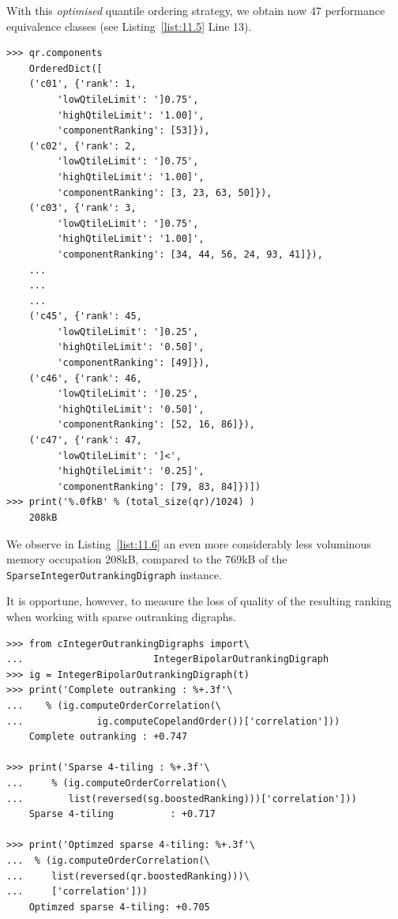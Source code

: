 With this \emph{optimised} quantile ordering strategy, we obtain now 47 performance equivalence classes (see Listing~\vref{list:11.5} Line 13).
\begin{lstlisting}[caption={The ordered components of the sparse outranking digraph},label=list:11.6]
>>> qr.components
    OrderedDict([
    ('c01', {'rank': 1,
	     'lowQtileLimit': ']0.75',
	     'highQtileLimit': '1.00]',
	     'componentRanking': [53]}),
    ('c02', {'rank': 2,
	     'lowQtileLimit': ']0.75',
	     'highQtileLimit': '1.00]',
	     'componentRanking': [3, 23, 63, 50]}),
    ('c03', {'rank': 3,
	     'lowQtileLimit': ']0.75',
	     'highQtileLimit': '1.00]',
	     'componentRanking': [34, 44, 56, 24, 93, 41]}), 
    ...
    ...
    ...
    ('c45', {'rank': 45,
	     'lowQtileLimit': ']0.25',
	     'highQtileLimit': '0.50]',
	     'componentRanking': [49]}),
    ('c46', {'rank': 46,
	     'lowQtileLimit': ']0.25',
	     'highQtileLimit': '0.50]',
	     'componentRanking': [52, 16, 86]}),
    ('c47', {'rank': 47,
	     'lowQtileLimit': ']<',
	     'highQtileLimit': '0.25]',
	     'componentRanking': [79, 83, 84]})])
>>> print('%.0fkB' % (total_size(qr)/1024) )
    208kB
\end{lstlisting}

We observe in Listing~\vref{list:11.6} an even more considerably less voluminous memory occupation 208kB, compared to the 769kB of the \texttt{SparseIntegerOutran\-king\-Digraph} instance.

It is opportune, however, to measure the loss of quality of the resulting \Copeland ranking when working with sparse outranking digraphs.
\begin{lstlisting}[caption={Measuring the loss of quality with respect to the standard outranking digraph},label=list:11.7]
>>> from cIntegerOutrankingDigraphs import\
...                       IntegerBipolarOutrankingDigraph
>>> ig = IntegerBipolarOutrankingDigraph(t)
>>> print('Complete outranking : %+.3f'\
...    % (ig.computeOrderCorrelation(\
...             ig.computeCopelandOrder())['correlation']))
    Complete outranking : +0.747

>>> print('Sparse 4-tiling : %+.3f'\
...     % (ig.computeOrderCorrelation(\
...        list(reversed(sg.boostedRanking)))['correlation']))   
    Sparse 4-tiling          : +0.717

>>> print('Optimzed sparse 4-tiling: %+.3f'\
...  % (ig.computeOrderCorrelation(\
...     list(reversed(qr.boostedRanking)))\
...     ['correlation']))  
    Optimzed sparse 4-tiling: +0.705
\end{lstlisting}

